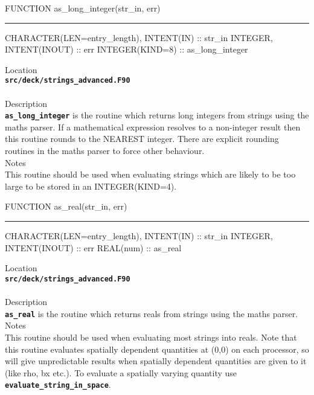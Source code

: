 \documentclass[12pt,a4paper]{article}
\newcommand{\HRule}{\rule[0.3cm]{\linewidth}{0.5mm}}
\newcommand{\inlinecode}[1]{{\color{warwickred} \bf\texttt{#1}}}
\begin{document}
\pagebreak
\begin{codedef}
FUNCTION as_long_integer(str_in, err)
\HRule
CHARACTER(LEN=entry_length), INTENT(IN) :: str_in
INTEGER, INTENT(INOUT) :: err
INTEGER(KIND=8) :: as_long_integer
\end{codedef}
\vspace{1cm}
{\Large Location\\}
\inlinecode{src/deck/strings\_advanced.F90}\\
\\[0.5cm]
{\Large Description\\}
\inlinecode{as\_long\_integer} is the routine which returns long integers from
strings using the maths parser. If a mathematical expression resolves to a
non-integer result then this routine rounds to the NEAREST integer. There are
explicit rounding routines in the maths parser to force other behaviour.
\\[0.5cm]
{\Large Notes\\}
This routine should be used when evaluating strings which are likely to be too
large to be stored in an INTEGER(KIND=4).

\pagebreak
\begin{codedef}
FUNCTION as_real(str_in, err)
\HRule
CHARACTER(LEN=entry_length), INTENT(IN) :: str_in
INTEGER, INTENT(INOUT) :: err
REAL(num) :: as_real
\end{codedef}
\vspace{1cm}
{\Large Location\\}
\inlinecode{src/deck/strings\_advanced.F90}\\
\\[0.5cm]
{\Large Description\\}
\inlinecode{as\_real} is the routine which returns reals from strings using the
maths parser.
\\[0.5cm]
{\Large Notes\\}
This routine should be used when evaluating most strings into reals. Note that
this routine evaluates spatially dependent quantities at (0,0) on each
processor, so will give unpredictable results when spatially dependent
quantities are given to it (like rho, bx etc.). To evaluate a spatially varying
quantity use \inlinecode{evaluate\_string\_in\_space}.
\end{document}
